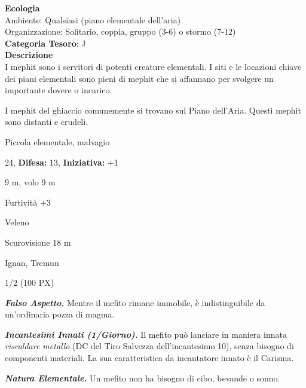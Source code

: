 \begin{multicols}{2}
{\textbf{Ecologia}\\
Ambiente: Qualsiasi (piano elementale dell'aria)\\
Organizzazione: Solitario, coppia, gruppo (3-6) o stormo (7-12)\\
\textbf{Categoria Tesoro}: J\\
\textbf{Descrizione}\\
I mephit sono i servitori di potenti creature elementali. I siti e le locazioni chiave dei piani elementali sono pieni di mephit che si affannano per svolgere un importante dovere o incarico.

I mephit del ghiaccio comunemente si trovano sul Piano dell'Aria. Questi mephit sono distanti e crudeli.

\noindent
\begin{description}[noitemsep, topsep=0pt, parsep=0pt, partopsep=0pt, leftmargin=0cm, labelwidth=2.2cm]
	\item[\textbf{Taglia/Tipo:}] Piccola elementale, malvagio
	\item[\textbf{Caratt.:}] 
	\item[\textbf{Punti Ferita:}] 24,  \textbf{Difesa:} 13,  \textbf{Iniziativa:} +1
	\item[\textbf{Movimento:}] 9 m, volo 9 m
	\item[\textbf{Tiri Salvez.:}] 
	\item[\textbf{Comp.:}] Furtività +3
	\item[\textbf{Imm. Danni:}] Veleno
	\item[\textbf{Sensi:}] Scurovisione 18 m
	\item[\textbf{Linguaggi:}] Ignan, Tremun
	\item[\textbf{Sfida:}] 1/2 (100 PX)\smallskip
\end{description}

\emph{\textbf{Falso Aspetto.}} Mentre il mefito rimane immobile, è indistinguibile da un'ordinaria pozza di magma.

\emph{\textbf{Incantesimi Innati (1/Giorno).}} Il mefito può lanciare in maniera innata \emph{riscaldare metallo} (DC del Tiro Salvezza dell'incantesimo 10), senza bisogno di componenti materiali. La sua caratteristica da incantatore innato è il Carisma.

\emph{\textbf{Natura Elementale.}} Un mefito non ha bisogno di cibo, bevande o sonno.

}
\end{multicols}
